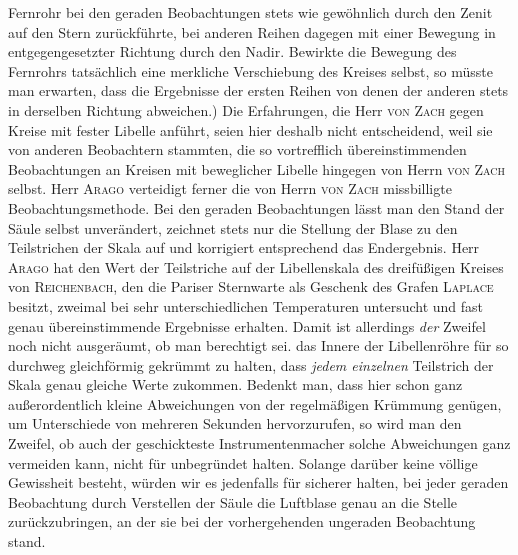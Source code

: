 Fernrohr bei den geraden Beobachtungen stets wie gewöhnlich durch den Zenit auf den Stern zurückführte, bei anderen Reihen dagegen mit einer Bewegung in entgegengesetzter Richtung durch den Nadir. Bewirkte die Bewegung des Fernrohrs tatsächlich eine merkliche Verschiebung des Kreises selbst, so müsste man erwarten, dass die Ergebnisse der ersten Reihen von denen der anderen stets in derselben Richtung abweichen.) Die Erfahrungen, die Herr \textsc{von Zach} gegen Kreise mit fester Libelle anführt, seien hier deshalb nicht entscheidend, weil sie von anderen Beobachtern stammten, die so vortrefflich übereinstimmenden Beobachtungen an Kreisen mit beweglicher Libelle hingegen von Herrn \textsc{von Zach} selbst. Herr \textsc{Arago} verteidigt ferner die von Herrn \textsc{von Zach} missbilligte Beobachtungsmethode. Bei den geraden Beobachtungen lässt man den Stand der Säule selbst unverändert, zeichnet stets nur die Stellung der Blase zu den Teilstrichen der Skala auf und korrigiert entsprechend das Endergebnis. Herr \textsc{Arago} hat den Wert der Teilstriche auf der Libellenskala des dreifüßigen Kreises von \textsc{Reichenbach}, den die Pariser Sternwarte als Geschenk des Grafen \textsc{Laplace} besitzt, zweimal bei sehr unterschiedlichen Temperaturen untersucht und fast genau übereinstimmende Ergebnisse erhalten. Damit ist allerdings \emph{der} Zweifel noch nicht ausgeräumt, ob man berechtigt sei. das Innere der Libellenröhre für so durchweg gleichförmig gekrümmt zu halten, dass \emph{jedem einzelnen} Teilstrich der Skala genau gleiche Werte zukommen. Bedenkt man, dass hier schon ganz außerordentlich kleine Abweichungen von der regelmäßigen Krümmung genügen, um Unterschiede von mehreren Sekunden hervorzurufen, so wird man den Zweifel, ob auch der geschickteste Instrumentenmacher solche Abweichungen ganz vermeiden kann, nicht für unbegründet halten. Solange darüber keine völlige Gewissheit besteht, würden wir es jedenfalls für sicherer halten, bei jeder geraden Beobachtung durch Verstellen der Säule die Luftblase genau an die Stelle zurückzubringen, an der sie bei der vorhergehenden ungeraden Beobachtung stand.

